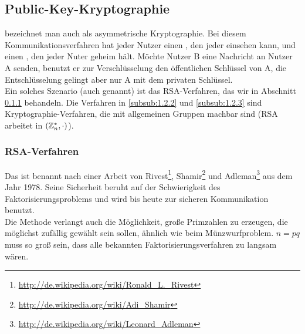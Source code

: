 \subsection{Public-Key-Kryptographie}
\label{sub:1.2}
	 bezeichnet man auch als asymmetrische Kryptographie.\marginnote{[5]} Bei diesem Kommunikationsverfahren hat jeder Nutzer einen , den jeder einsehen kann, und einen , den jeder Nuter geheim hält. 
	Möchte Nutzer B eine Nachricht an Nutzer A senden, benutzt er zur Verschlüsselung den öffentlichen Schlüssel von A, die Entschlüsselung gelingt aber nur A mit dem privaten Schlüssel. 
	  \\
	Ein solches Szenario (auch  genannt) ist das RSA-Verfahren, das wir in Abschnitt \ref{subsub:1.2.1} behandeln. 
	Die Verfahren in \ref{subsub:1.2.2} und \ref{subsub:1.2.3} sind Kryptographie-Verfahren, die mit allgemeinen Gruppen machbar sind (RSA arbeitet in $(\mathbb{Z}_n^*,\cdot)$).
	
\subsubsection{RSA-Verfahren}
\label{subsub:1.2.1}
	Das  ist benannt nach einer Arbeit von Rivest\footnote{\url{http://de.wikipedia.org/wiki/Ronald_L._Rivest}}, Shamir\footnote{\url{http://de.wikipedia.org/wiki/Adi_Shamir}} und Adleman\footnote{\url{http://de.wikipedia.org/wiki/Leonard_Adleman}} aus dem Jahr 1978. 
	Seine Sicherheit beruht auf der Schwierigkeit des Faktorisierungsproblems und wird bis heute zur sicheren Kommunikation benutzt. \\
	Die Methode verlangt auch die Möglichkeit, große Primzahlen zu erzeugen, die möglichst zufällig gewählt sein sollen, ähnlich wie beim Münzwurfproblem. 
	$n = pq$ muss so groß sein, dass alle bekannten Faktorisierungsverfahren zu langsam wären.
	
